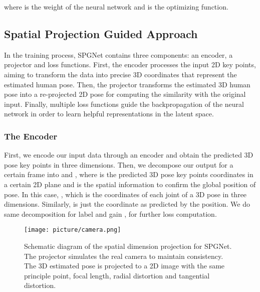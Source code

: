 \documentclass[runningheads]{llncs}
\begin{document}
where  is the weight of the neural network and  is the optimizing function.
\label{subsec:formulation}

\subsection{Spatial Projection Guided Approach} \label{subsec:approach}

In the training process, SPGNet contains three components: an encoder, a projector and loss functions. First, the encoder processes the input 2D key points, aiming to transform the data into precise 3D coordinates that represent the estimated human pose. Then, the projector transforms the estimated 3D human pose into a re-projected 2D pose for computing the similarity with the original input. Finally, multiple loss functions guide the backpropagation of the neural network in order to learn helpful representations in the latent space.

\subsubsection{The Encoder} First, we encode our input data through an encoder and obtain the predicted 3D pose key points in three dimensions. Then, we decompose our output  for a certain frame into  and , where  is the predicted 3D pose key points coordinates in a certain 2D plane and  is the spatial information to confirm the global position of pose. In this case, , which is the  coordinates of each joint of a 3D pose in three dimensions. Similarly,  is just the  coordinate as predicted by the position. We do same decomposition for label  and gain ,  for further loss computation.

\begin{figure}[!ht]
\texttt{[image: picture/camera.png]}
\caption{Schematic diagram of the spatial dimension projection for SPGNet. The projector simulates the real camera to maintain consistency. The 3D estimated pose is projected to a 2D image with the same principle point, focal length, radial distortion and tangential distortion.} \label{projection}
\end{figure}
\end{document}
